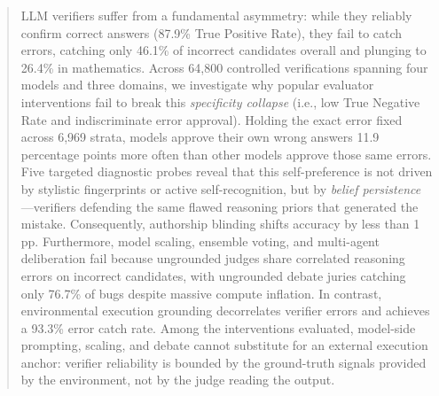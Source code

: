 \begin{abstract}
LLM verifiers suffer from a fundamental asymmetry: while they reliably confirm correct answers (87.9\% True Positive Rate), they fail to catch errors, catching only 46.1\% of incorrect candidates overall and plunging to 26.4\% in mathematics. Across 64,800 controlled verifications spanning four models and three domains, we investigate why popular evaluator interventions fail to break this \emph{specificity collapse} (i.e., low True Negative Rate and indiscriminate error approval). Holding the exact error fixed across 6,969 strata, models approve their own wrong answers 11.9 percentage points more often than other models approve those same errors. Five targeted diagnostic probes reveal that this self-preference is not driven by stylistic fingerprints or active self-recognition, but by \emph{belief persistence}---verifiers defending the same flawed reasoning priors that generated the mistake. Consequently, authorship blinding shifts accuracy by less than 1\,pp. Furthermore, model scaling, ensemble voting, and multi-agent deliberation fail because ungrounded judges share correlated reasoning errors on incorrect candidates, with ungrounded debate juries catching only 76.7\% of bugs despite massive compute inflation. In contrast, environmental execution grounding decorrelates verifier errors and achieves a 93.3\% error catch rate. Among the interventions evaluated, model-side prompting, scaling, and debate cannot substitute for an external execution anchor: verifier reliability is bounded by the ground-truth signals provided by the environment, not by the judge reading the output.
\end{abstract}
